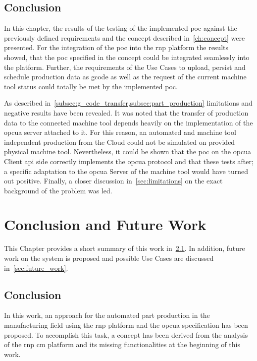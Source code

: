 \documentclass[
a4paper,
twoside,
headsepline,
cleardoublepage=empty,
parskip=half,
draft=false
]{scrbook}
\begin{document}
		\section{Conclusion}\label{sec:discussion_conclusion}
		
			In this chapter, the results of the testing of the implemented \gls{poc} against the previously defined requirements and the concept described in~\cref{ch:concept} were presented.
			For the integration of the \gls{poc} into the \gls{rnp} platform the results showed, that the \gls{poc} specified in the concept could be integrated seamlessly into the platform.
			Further, the requirements of the Use Cases to upload, persist and schedule production data as \gls{gcode} as well as the request of the current machine tool status could totally be met by the implemented \gls{poc}.
			
			As described in~\cref{subsec:g_code_transfer,subsec:part_production} limitations and negative results have been revealed.
			It was noted that the transfer of production data to the connected machine tool depends heavily on the implementation of the \gls{opcua} server attached to it. 
			For this reason, an automated and machine tool independent production from the Cloud could not be simulated on provided physical machine tool.
			Nevertheless, it could be shown that the \gls{poc} on the \gls{opcua} Client \gls{api} side correctly implements the \gls{opcua} protocol and that these tests after; a specific adaptation to the \gls{opcua} Server of the machine tool would have turned out positive.
			Finally, a closer discussion in~\cref{sec:limitations} on the exact background of the problem was led.

	\chapter{Conclusion and Future Work} \label{ch:conclusion_and_future_work}

		This Chapter provides a short summary of this work in~\cref{sec:conclusion}. In addition, future work on the system is proposed and possible Use Cases are discussed in~\cref{sec:future_work}.

		\section{Conclusion}\label{sec:conclusion}

			In this work, an approach for the automated part production in the manufacturing field using the \gls{rnp} platform and the \gls{opcua} specification has been proposed. To accomplish this task, a concept has been derived from the analysis of the \gls{rnp} \gls{cm} platform and its missing functionalities at the beginning of this work.
\end{document}
